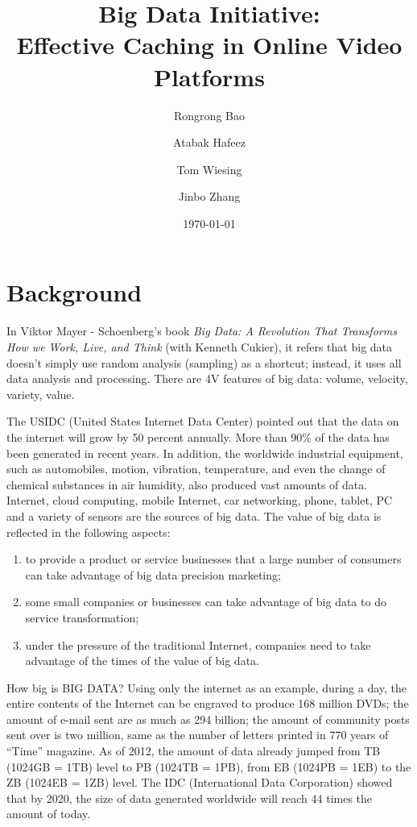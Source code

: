 \documentclass[a4paper,10pt]{article}
\title{Big Data Initiative:\\Effective Caching in Online Video Platforms}
\author{Rongrong Bao \and Atabak Hafeez \and Tom Wiesing \and Jinbo Zhang}
\date{\today}
\begin{document}
\maketitle

\section{Background}

In Viktor Mayer - Schoenberg’s book \textit{Big Data: A Revolution That Transforms How we Work, Live, and Think} (with Kenneth Cukier), it refers that big data doesn't simply use random analysis (sampling) as a shortcut; instead, it uses all data analysis and processing. There are 4V features of big data: volume, velocity, variety, value.

The USIDC (United States Internet Data Center) pointed out that the data on the internet will grow by 50 percent annually. More than 90\% of the data has been generated in recent years. In addition, the worldwide industrial equipment, such as automobiles, motion, vibration, temperature, and even the change of chemical substances in air humidity, also produced vast amounts of data. Internet, cloud computing, mobile Internet, car networking, phone, tablet, PC and a variety of sensors are the sources of big data. The value of big data is reflected in the following aspects:
\begin{enumerate}
  \item to provide a product or service businesses that a large number of consumers can take advantage of big data precision marketing;
  \item some small companies or businesses can take advantage of big data to do service transformation;
  \item under the pressure of the traditional Internet, companies need to take advantage of the times of the value of big data.
\end{enumerate}

How big is BIG DATA? Using only the internet as an example, during a day, the entire contents of the Internet can be engraved to produce 168 million DVDs; the amount of e-mail sent are as much as 294 billion; the amount of community posts sent over is two million, same as the number of letters printed in 770 years of ``Time'' magazine. As of 2012, the amount of data already jumped from TB (1024GB = 1TB) level to PB (1024TB = 1PB), from EB (1024PB = 1EB) to the ZB (1024EB = 1ZB) level. The IDC (International Data Corporation) showed that by 2020, the size of data generated worldwide will reach 44 times the amount of today.
\end{document}
